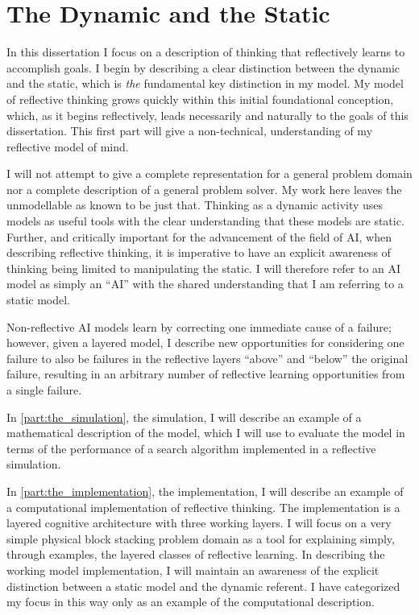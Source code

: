 \chapter{The Dynamic and the Static}
\label{chapter:the_dynamic_and_the_static}

In this dissertation I focus on a description of thinking that
reflectively learns to accomplish goals.  I begin by describing a
clear distinction between the dynamic and the static, which is
\emph{the} fundamental key distinction in my model.  My model of
reflective thinking grows quickly within this initial foundational
conception, which, as it begins reflectively, leads necessarily and
naturally to the goals of this dissertation.  This first part will
give a non-technical, understanding of my reflective model of mind.

I will not attempt to give a complete representation for a general
problem domain nor a complete description of a general problem solver.
My work here leaves the unmodellable as known to be just that.
Thinking as a dynamic activity uses models as useful tools with the
clear understanding that these models are static.  Further, and
critically important for the advancement of the field of AI, when
describing reflective thinking, it is imperative to have an explicit
awareness of thinking being limited to manipulating the static.  I
will therefore refer to an AI model as simply an ``AI'' with the
shared understanding that I am referring to a static model.

Non-reflective AI models learn by correcting one immediate cause of a
failure; however, given a layered model, I describe new opportunities
for considering one failure to also be failures in the reflective
layers ``above'' and ``below'' the original failure, resulting in an
arbitrary number of reflective learning opportunities from a single
failure.

In \autoref{part:the_simulation}, the simulation, I will describe an
example of a mathematical description of the model, which I will use
to evaluate the model in terms of the performance of a search
algorithm implemented in a reflective simulation.

In \autoref{part:the_implementation}, the implementation, I will
describe an example of a computational implementation of reflective
thinking.  The implementation is a layered cognitive architecture with
three working layers.  I will focus on a very simple physical block
stacking problem domain as a tool for explaining simply, through
examples, the layered classes of reflective learning.  In describing
the working model implementation, I will maintain an awareness of the
explicit distinction between a static model and the dynamic referent.
I have categorized my focus in this way only as an example of the
computational description.

